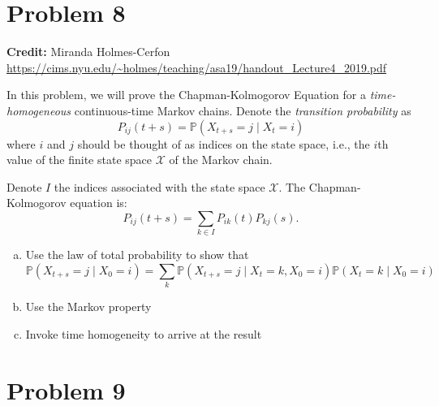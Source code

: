\documentclass[11pt]{extarticle}
\theoremstyle{plain}
\theoremstyle{definition}
\begin{document}
\vspace{10mm}
\section*{Problem 8}

\textbf{Credit:} Miranda Holmes-Cerfon \url{https://cims.nyu.edu/~holmes/teaching/asa19/handout_Lecture4_2019.pdf}

\vspace{5mm}
\noindent
In this problem, we will prove the Chapman-Kolmogorov Equation for a \textit{time-homogeneous} continuous-time Markov chains. Denote the \textit{transition probability} as
\begin{equation*}
	P_{ij}(t+s) = \mathbb P(X_{t+s} = j \mid X_t = i)
\end{equation*}
where $i$ and $j$ should be thought of as indices on the state space, i.e., the $i$th value of the finite state space $\mathcal X$ of the Markov chain.

Denote $I$ the indices associated with the state space $\mathcal X$. The Chapman-Kolmogorov equation is: 
\begin{equation*}
	P_{ij}(t+s) = \sum_{k \in I} P_{ik}(t) P_{kj}(s).
\end{equation*}

\begin{enumerate}[(a)]
\item Use the law of total probability to show that 
\begin{equation*}
	\mathbb P(X_{t+s} = j \mid X_0 = i) = \sum_k \mathbb P(X_{t+s} = j \mid X_t = k, X_0 = i) \mathbb P(X_t = k \mid X_0 = i) 
\end{equation*}

\item Use the Markov property

\item Invoke time homogeneity to arrive at the result
\end{enumerate}



\vspace{10mm}
\section*{Problem 9}
\end{document}
